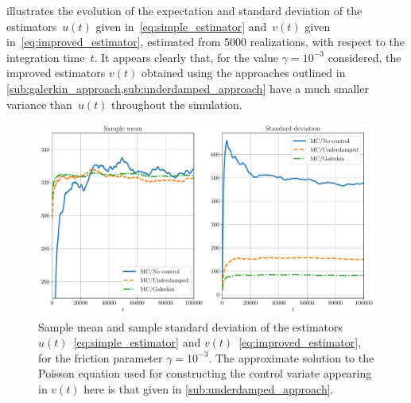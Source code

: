 \documentclass[11pt,a4paper]{article}
\begin{document}
 illustrates the evolution of the expectation and standard deviation of the estimators~$u(t)$ given in~\eqref{eq:simple_estimator} and~$v(t)$ given in~\eqref{eq:improved_estimator},
estimated from 5000 realizations,
with respect to the integration time~$t$.
It appears clearly that,
for the value $\gamma = 10^{-3}$ considered,
the improved estimators $v(t)$ obtained using the approaches outlined in \cref{sub:galerkin_approach,sub:underdamped_approach}
have a much smaller variance than~$u(t)$ throughout the simulation.
\begin{figure}[ht]
    \centering
    \includegraphics[width=0.99\linewidth]{figures/time.pdf}
    \caption{
        Sample mean and sample standard deviation of the estimators $u(t)$~\eqref{eq:simple_estimator} and $v(t)$~\eqref{eq:improved_estimator},
        for the friction parameter $\gamma = 10^{-3}$.
        The approximate solution to the Poisson equation used for constructing the control variate appearing in $v(t)$ here
        is that given in \cref{sub:underdamped_approach}.
    }%
    \label{fig:time_bias_variance}
\end{figure}
\end{document}
